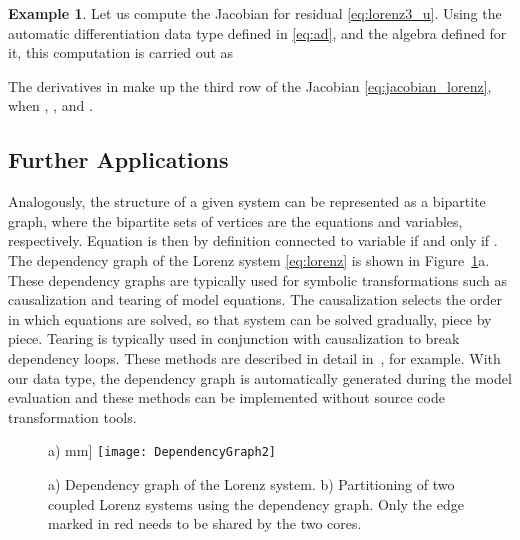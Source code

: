 \documentclass[10pt]{ijnam}
\theoremstyle{definition}
\newtheorem{example}{Example}[section]
\newcommand\xqed[1]{\leavevmode\unskip\penalty9999 \hbox{}\nobreak\hfill \quad\hbox{#1}}
\newcommand{\exampleSymbol}{\xqed{}}
\begin{document}
\begin{example}
Let us compute the Jacobian for residual \eqref{eq:lorenz3_u}.
Using the automatic differentiation data type defined in \eqref{eq:ad}, and the 
algebra defined for it, this computation is carried out as

The derivatives in  make up the third row of the Jacobian
\eqref{eq:jacobian_lorenz}, when , , and . \exampleSymbol
\end{example}

\subsection{Further Applications}
\label{subsec:Further Applications}

Analogously, the structure of a given system can be represented as a bipartite graph, where the bipartite sets of vertices are the equations and variables, respectively. Equation  is then by definition connected to variable  if and only if . The dependency graph of the Lorenz system \eqref{eq:lorenz} is shown in Figure~\ref{fig:DependencyGraph}a. These dependency graphs are typically used for symbolic transformations such as causalization and tearing of model equations. The causalization selects the order in which equations are solved, so that system can be solved gradually, piece by piece. Tearing is typically used in conjunction with causalization to break dependency loops. These methods are described in detail in~\cite{cellier2006}, for example. With our data type, the dependency graph is automatically generated during the model evaluation and these methods can be implemented without source code transformation tools.

\begin{figure}[htb]
    \centering
    \begin{minipage}{0.3\textwidth}
        \centering
        {\scriptsize{a)}} \1mm]
        \texttt{[image: DependencyGraph2]}
    \end{minipage}
    \caption{a) Dependency graph of the Lorenz system. b) Partitioning of two coupled Lorenz systems using the dependency graph. Only the edge marked in red needs to be shared by the two cores.}
    \label{fig:DependencyGraph}
\end{figure}
\end{document}
